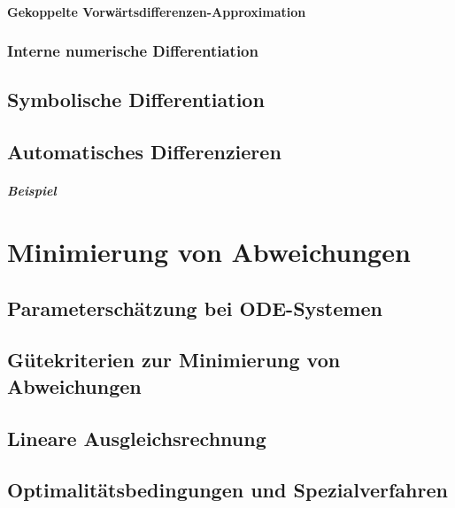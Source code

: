 			\subsubsection{Gekoppelte Vorwärtsdifferenzen-Approximation} %

		\subsection{Interne numerische Differentiation} %

	\section{Symbolische Differentiation} %

	\section{Automatisches Differenzieren} %

		\paragraph{Beispiel} %

\chapter{Minimierung von Abweichungen} %

	\section{Parameterschätzung bei ODE-Systemen} %

	\section{Gütekriterien zur Minimierung von Abweichungen} %

	\section{Lineare Ausgleichsrechnung} %

	\section{Optimalitätsbedingungen und Spezialverfahren} %

